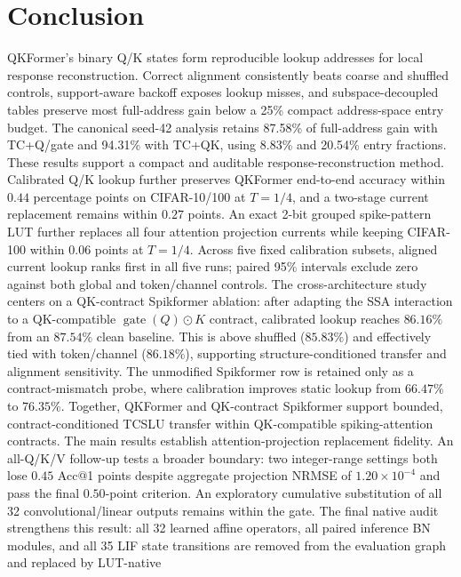 \section{Conclusion}
\label{sec:conclusion}

QKFormer's binary Q/K states form reproducible lookup addresses for local
response reconstruction. Correct alignment consistently beats coarse and
shuffled controls, support-aware backoff exposes lookup misses, and
subspace-decoupled tables preserve most full-address gain below a 25\% compact
address-space entry budget. The canonical seed-42 analysis retains 87.58\% of
full-address gain with TC+Q/gate and 94.31\% with TC+QK, using 8.83\% and
20.54\% entry fractions. These results support a compact and auditable
response-reconstruction method. Calibrated Q/K lookup further preserves
QKFormer end-to-end accuracy within $0.44$ percentage points on CIFAR-10/100 at
$T=1/4$, and a two-stage current replacement remains within $0.27$ points.
An exact 2-bit grouped spike-pattern LUT further replaces all four attention
projection currents while keeping CIFAR-100 within $0.06$ points at $T=1/4$.
Across five fixed calibration subsets, aligned current lookup ranks first in
all five runs; paired 95\% intervals exclude zero against both global and
token/channel controls. The cross-architecture study centers on a
QK-contract Spikformer ablation: after adapting the SSA interaction to a
QK-compatible $\operatorname{gate}(Q)\odot K$ contract, calibrated lookup
reaches $86.16\%$ from an $87.54\%$ clean baseline. This is above shuffled
($85.83\%$) and effectively tied with token/channel ($86.18\%$), supporting
structure-conditioned transfer and alignment sensitivity. The unmodified
Spikformer row is retained only as a contract-mismatch probe, where calibration
improves static lookup from $66.47\%$ to $76.35\%$. Together, QKFormer and
QK-contract Spikformer support bounded, contract-conditioned TCSLU transfer
within QK-compatible spiking-attention contracts.
The main results establish attention-projection replacement fidelity. An
all-Q/K/V follow-up tests a broader boundary: two integer-range
settings both lose $0.45$ Acc@1 points despite aggregate projection NRMSE of
$1.20\times10^{-4}$ and pass the final $0.50$-point criterion. An exploratory
cumulative substitution of all 32 convolutional/linear outputs remains within
the gate. The final native audit strengthens this result: all 32 learned
affine operators, all paired inference BN modules, and all 35 LIF state
transitions are removed from the evaluation graph and replaced by LUT-native
